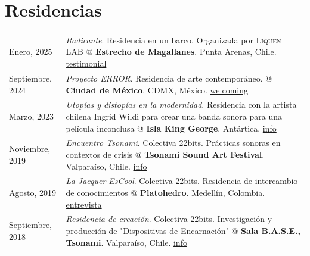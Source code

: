 \documentclass[a4paper,11pt]{article}
\makeatletter
\newenvironment{joblong}[2]
    {
    \begin{tabularx}{\linewidth}{@{}l X r@{}}
    \textbf{#1} & \hfill &  #2 \\[3.75pt]
    \end{tabularx}
    \begin{minipage}[t]{\linewidth}
    \begin{itemize}[nosep,after=\strut, leftmargin=1em, itemsep=3pt,label=--]
    }
    {
    \end{itemize}
    \end{minipage}    
    }
\makeatother
\begin{document}

\section{Residencias}
\begin{tabularx}{\linewidth}{@{}l X@{}}	

Enero, 2025 & \textit{Radicante}. Residencia en un barco. Organizada por \textsc{Liquen LAB} @  \textbf{Estrecho de Magallanes}. Punta Arenas, Chile. \hfill \normalsize \href{https://www.instagram.com/p/DFvAEfCok0J/}{testimonial} \\

Septiembre, 2024 & \textit{Proyecto ERROR}. Residencia de arte contemporáneo. @  \textbf{Ciudad de México}. CDMX, México. \hfill \normalsize \href{https://www.instagram.com/p/C_3IjYUOlui}{welcoming} \\

Marzo, 2023 & \textit{Utopías y distopías en la modernidad}. Residencia con la artista chilena Ingrid Wildi para crear una banda sonora para una película inconclusa @  \textbf{Isla King George}. Antártica. \hfill \normalsize \href{https://misaa.cc/projects/utopiasydistopias.html}{info} \\

Noviembre, 2019 & \textit{Encuentro Tsonami}. Colectiva 22bits. Prácticas sonoras en contextos de crisis @  \textbf{Tsonami Sound Art Festival}. Valparaíso, Chile. \hfill \normalsize \href{https://misaa.cc/projects/tsonami2019.html}{info} \\

Agosto, 2019 & \textit{La Jacquer EsCool}. Colectiva 22bits. Residencia de intercambio de conocimientos @  \textbf{Platohedro}. Medellín, Colombia. \hfill \normalsize \href{https://platoteca.platohedro.org/?p=9508}{entrevista} \\

Septiembre, 2018 & \textit{Residencia de creación}. Colectiva 22bits. Investigación y producción de "Dispositivas de Encarnación" @  \textbf{Sala B.A.S.E., Tsonami}. Valparaíso, Chile. \hfill \normalsize \href{https://misaa.cc/projects/dispositivas.html}{info} \\

\end{tabularx}
  
\end{document}
